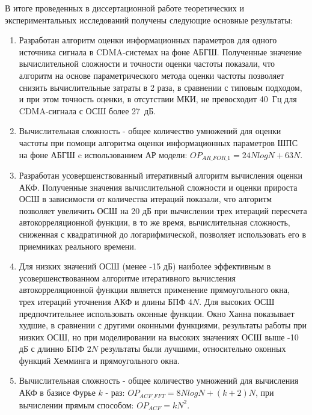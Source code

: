 В итоге проведенных в диссертационной работе теоретических и экспериментальных исследований получены следующие основные результаты:
\begin{enumerate}
	\item {Разработан алгоритм оценки информационных параметров для одного источника сигнала в CDMA-системах на фоне АБГШ.
		Полученные значение вычислительной сложности и точности оценки частоты показали, что алгоритм на основе параметрического метода
		оценки частоты позволяет снизить вычислительные затраты в 2 раза, в сравнении с типовым подходом, и при этом точность оценки, в отсутствии МКИ,
		не превосходит \mbox{40 Гц} для CDMA-сигнала с ОСШ более \mbox{27 дБ.}}

	\item Вычислительная сложность - общее количество умножений для оценки частоты при помощи алгоритма оценки информационных параметров ШПС на фоне АБГШ c использованием АР модели:
		${OP_{AR\_FOR\_1} = 24NlogN + 63N}$.	

	\item {Разработан усовершенствованный итеративный алгоритм вычисления оценки АКФ. Полученные значения вычислительной сложности и оценки прироста ОСШ в зависимости
		от количества итераций показали, что алгоритм позволяет увеличить ОСШ на 20 дБ при вычислении трех итераций пересчета автокорреляционной функции, в то
		же время, вычислительная сложность, сниженная с квадратичной до логарифмической, позволяет использовать его в приемниках реального времени.}
	
	\item Для низких значений ОСШ (менее -15 дБ) наиболее эффективным в усовершенствованном алгоритме итеративного вычисления автокорреляционной функции
		является применение прямоугольного окна, трех итераций уточнения АКФ и длины БПФ ${4N}$.
		Для высоких ОСШ предпочтительнее использовать оконные функции. Окно Ханна показывает худшие, в сравнении с другими оконными функциями,
		результаты работы при низких ОСШ, но при моделировании на высоких значениях ОСШ выше -10 дБ с длинно БПФ ${2N}$ результаты были лучшими,
		относительно оконных функций Хемминга и прямоугольного окна.

	\item Вычислительная сложность - общее количество умножений для вычисления АКФ в базисе Фурье ${k}$ - раз: ${OP_{ACF\_FFT}=8NlogN + (k+2)N}$, при вычислении
		прямым способом: ${OP_{ACF}=kN^2}$.


\end{enumerate}
